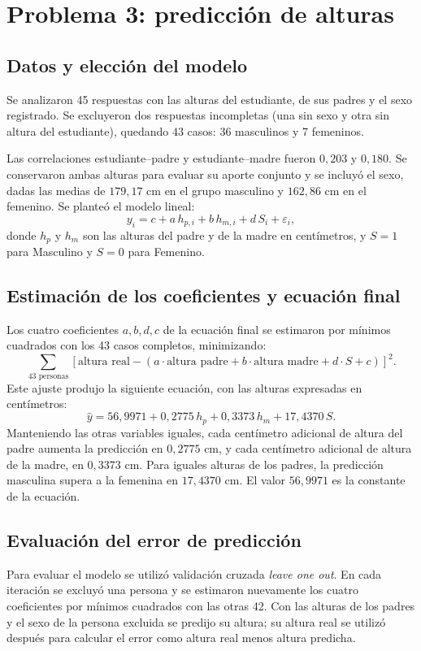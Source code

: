 \documentclass[10pt,a4paper]{article}
\begin{document}
\newpage

\section{Problema 3: predicción de alturas}

\subsection{Datos y elección del modelo}
Se analizaron 45 respuestas con las alturas del estudiante, de sus padres y el sexo registrado. Se excluyeron dos respuestas incompletas (una sin sexo y otra sin altura del estudiante), quedando 43 casos: 36 masculinos y 7 femeninos.

Las correlaciones estudiante--padre y estudiante--madre fueron $0{,}203$ y $0{,}180$. Se conservaron ambas alturas para evaluar su aporte conjunto y se incluyó el sexo, dadas las medias de $179{,}17$ cm en el grupo masculino y $162{,}86$ cm en el femenino. Se planteó el modelo lineal:
\[
y_i=c+a\,h_{p,i}+b\,h_{m,i}+d\,S_i+\varepsilon_i,
\]  
donde $h_p$ y $h_m$ son las alturas del padre y de la madre en centímetros, y $S=1$ para Masculino y $S=0$ para Femenino. 

\subsection{Estimación de los coeficientes y ecuación final}
Los cuatro coeficientes $a,b,d,c$ de la ecuación final se estimaron por mínimos cuadrados con los 43 casos completos, minimizando:
\[
\sum_{\text{43 personas}}
\left[\text{altura real}-(a\cdot\text{altura padre}
+b\cdot\text{altura madre}+d\cdot S+c)\right]^2.
\]
Este ajuste produjo la siguiente ecuación, con las alturas expresadas en centímetros:
\[
\boxed{\widehat y=56{,}9971+0{,}2775\,h_p+0{,}3373\,h_m+17{,}4370\,S.}
\]
Manteniendo las otras variables iguales, cada centímetro adicional de altura del padre aumenta la predicción en $0{,}2775$ cm, y cada centímetro adicional de altura de la madre, en $0{,}3373$ cm. Para iguales alturas de los padres, la predicción masculina supera a la femenina en $17{,}4370$ cm. El valor $56{,}9971$ es la constante de la ecuación.

\subsection{Evaluación del error de predicción}
Para evaluar el modelo se utilizó validación cruzada \textit{leave one out}. En cada iteración se excluyó una persona y se estimaron nuevamente los cuatro coeficientes por mínimos cuadrados con las otras 42. Con las alturas de los padres y el sexo de la persona excluida se predijo su altura; su altura real se utilizó después para calcular el error como altura real menos altura predicha.
\end{document}
